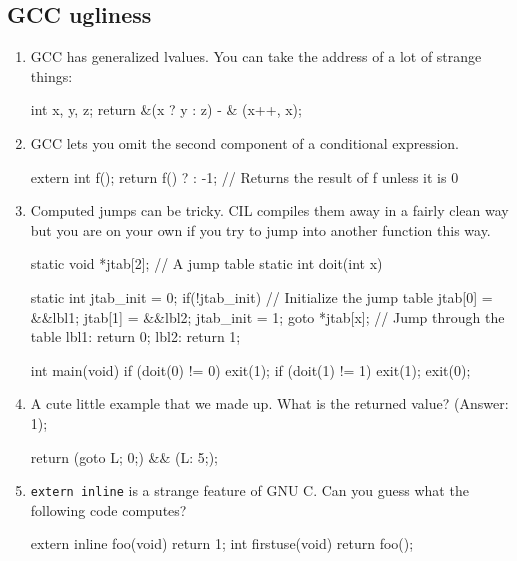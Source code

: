 \documentclass[letterpaper]{article}
\def\t#1{{\tt #1}}
\begin{document}
 \subsection{GCC ugliness}\label{sec-ugly-gcc}

\begin{enumerate}

\item GCC has generalized lvalues. You can take the address of a lot of
strange things:

\begin{cilcode}[local]
  int x, y, z;
  return &(x ? y : z) - & (x++, x);
\end{cilcode}

\item GCC lets you omit the second component of a conditional expression.

\begin{cilcode}[local]
  extern int f();
  return f() ? : -1; // Returns the result of f unless it is 0
\end{cilcode}

\item Computed jumps can be tricky. CIL compiles them away in a fairly clean
way but you are on your own if you try to jump into another function this way.

\begin{cilcode}[global]
static void *jtab[2]; // A jump table
static int doit(int x){
 
  static int jtab_init = 0;
  if(!jtab_init) { // Initialize the jump table
    jtab[0] = &&lbl1;
    jtab[1] = &&lbl2;
    jtab_init = 1;
  }
  goto *jtab[x]; // Jump through the table
lbl1:
  return 0;
lbl2:
  return 1;
}
 
int main(void){
  if (doit(0) != 0) exit(1);
  if (doit(1) != 1) exit(1);
  exit(0);
}
\end{cilcode}


\item A cute little example that we made up. What is the returned value?
(Answer: 1); 
\begin{cilcode}[local]
 return ({goto L; 0;}) && ({L: 5;});
\end{cilcode}

\item \t{extern inline} is a strange feature of GNU C. Can you guess what the
following code computes?

\begin{cilcode}[global]
extern inline foo(void) { return 1; }
int firstuse(void) { return foo(); }


\end{cilcode}
\end{enumerate}
\end{document}
